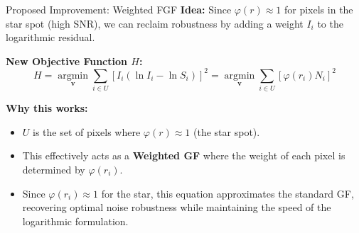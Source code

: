 \begin{frame}{Proposed Improvement: Weighted FGF}
    \textbf{Idea:} Since $\varphi(r) \approx 1$ for pixels in the star spot (high SNR), we can reclaim robustness by adding a weight $I_i$ to the logarithmic residual.
    
    \vspace{0.2cm}
    \textbf{New Objective Function $H$:}
    \[
    H = \operatorname*{argmin}_{\mathbf{v}} \sum_{i \in U} \left[ I_i (\ln I_i - \ln S_i) \right]^2 
      = \operatorname*{argmin}_{\mathbf{v}} \sum_{i \in U} \left[ \varphi(r_i) N_i \right]^2
    \]
    
    \vspace{0.2cm}
    \textbf{Why this works:}
    \begin{itemize}
        \item $U$ is the set of pixels where $\varphi(r) \approx 1$ (the star spot).
        \item This effectively acts as a \textbf{Weighted GF} where the weight of each pixel is determined by $\varphi(r_i)$.
        \item Since $\varphi(r_i) \approx 1$ for the star, this equation approximates the standard GF, recovering optimal noise robustness while maintaining the speed of the logarithmic formulation.
    \end{itemize}
\end{frame}

